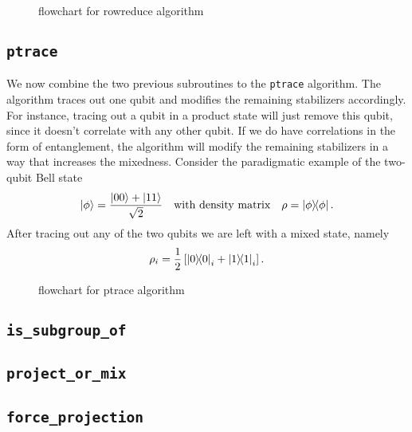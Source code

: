 \begin{figure}[H]
  \centering
  
  \caption{flowchart for rowreduce algorithm}
  \label{fig:rowreduce-diag}
\end{figure}

\subsection{\texttt{ptrace}}\label{sec:ptrace}
We now combine the two previous subroutines to the \verb|ptrace| algorithm.
The algorithm traces out one qubit and modifies the remaining stabilizers
accordingly. For instance, tracing out a qubit in a product state will just
remove this qubit, since it doesn't correlate with any other qubit. If we do
have correlations in the form of entanglement, the algorithm will modify the
remaining stabilizers in a way that increases the mixedness. 
Consider the paradigmatic example of the two-qubit Bell state
\[
  \ket{\phi} = \frac{\ket{00} + \ket{11}}{\sqrt{2}} \quad{\text{with density
  matrix}} \quad \rho = \dyad{\phi}.
\]
After tracing out any of the two qubits we are left with a mixed state, namely
$$\rho_i = \frac{1}{2} \left[\dyad{0}_i + \dyad{1}_i\right].$$


\begin{figure}[h]
  \centering
  
  \caption{flowchart for ptrace algorithm}
  \label{fig:ptrace-dig}
\end{figure}

\subsection{\texttt{is\_subgroup\_of}}

\subsection{\texttt{project\_or\_mix}}

\subsection{\texttt{force\_projection}}
